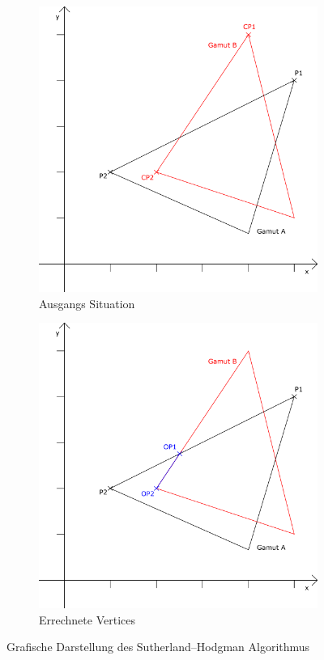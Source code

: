 \documentclass[11pt]{scrartcl}
\begin{document}
\begin{figure}[H]
    \centering
    \begin{subfigure}[b]{.39\textwidth}
        \includegraphics[width=\textwidth]{images/sutherland_hodgman_example.png}
        \caption{Ausgangs Situation}
    \end{subfigure}
    \hfill 
    \begin{subfigure}[b]{.39\textwidth}
        \includegraphics[width=\textwidth]{images/sutherland_hodgman_example_solution.png}
        \caption{Errechnete Vertices}
    \end{subfigure}
    \caption{Grafische Darstellung des Sutherland–Hodgman Algorithmus} \label{fig:sutherland_hodgman}
\end{figure}
\end{document}
